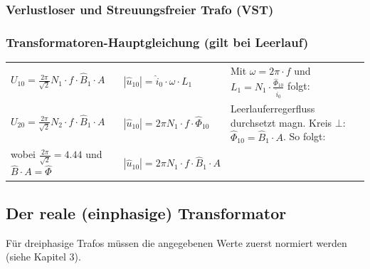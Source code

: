 		
		\subsubsection{Verlustloser und Streuungsfreier Trafo (VST)}
			 
		\renewcommand{\arraystretch}{1.5}	
		\subsubsection{Transformatoren-Hauptgleichung (gilt bei Leerlauf)}
			\begin{tabular}{p{7cm}p{4cm}p{6cm}}
      			$\boxed{U_{10} = \frac{2\pi}{\sqrt{2}}N_1 \cdot f \cdot \hat{B}_1 \cdot A}$
      			& 	$|\hat{u}_{10}| = \hat{i}_0 \cdot \omega \cdot L_1$ & Mit $\omega = 2\pi \cdot f$ und $L_1 = N_1 \cdot \frac{\hat{\Phi}_{10}}{\hat{i}_0}$ folgt: \\
      		
				$\boxed{U_{20} = \frac{2\pi}{\sqrt{2}}N_2 \cdot f \cdot \hat{B}_1 \cdot A}$
				& $|\hat{u}_{10}| = 2\pi N_1 \cdot f \cdot \hat{\Phi}_{10} $
            	& Leerlauferregerfluss durchsetzt magn. Kreis $\bot$:$ \hat{\Phi}_{10} = \hat{B}_1 \cdot A $. So folgt: \\
				
				wobei $\frac{2\pi}{\sqrt{2}} = 4.44$ und $\hat{B} \cdot A = \hat{\Phi}$ &
				$|\hat{u}_{10}| = 2\pi N_1 \cdot f \cdot \hat{B}_1 \cdot A	$
			\end{tabular}
		\renewcommand{\arraystretch}{1}	
		
	\newpage
	\subsection{Der reale (einphasige) Transformator}
		Für dreiphasige Trafos müssen die angegebenen Werte zuerst normiert werden (siehe Kapitel 3).
	
		\renewcommand{\arraystretch}{1.25}
